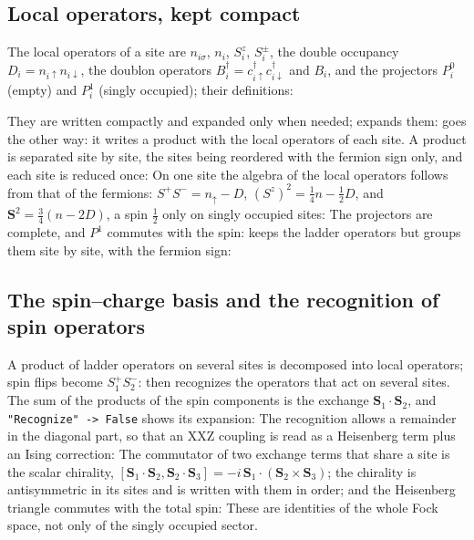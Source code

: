 \documentclass[11pt,a4paper]{article}
\begin{document}
\subsection{Local operators, kept compact}
The local operators of a site are $n_{i\sigma}$, $n_i$, $S^z_i$, $S^\pm_i$, the double occupancy
$D_i=n_{i\uparrow}n_{i\downarrow}$, the doublon operators $B^\dagger_i=c^\dagger_{i\uparrow}c^\dagger_{i\downarrow}$ and $B_i$, and the
projectors $P^0_i$ (empty) and $P^1_i$ (singly occupied); their definitions:

They are written compactly and expanded only when needed;  expands them:
 goes the other way: it writes a product with the local operators of each site. A product is
separated site by site, the sites being reordered with the fermion sign only, and each site is reduced once:
On one site the algebra of the local operators follows from that of the fermions: $S^+S^-=n_\uparrow-D$,
$(S^z)^2=\frac14n-\frac12D$, and $\mathbf S^2=\frac34(n-2D)$, a spin $\frac12$ only on singly occupied sites:
The projectors are complete, and $P^1$ commutes with the spin:
 keeps the ladder operators but groups them site by site, with the fermion sign:

\subsection{The spin--charge basis and the recognition of spin operators}
A product of ladder operators on several sites is decomposed into local operators; spin flips become $S^+_1S^-_2$:
 then recognizes the operators that act on several sites. The sum of the products of the spin
components is the exchange $\mathbf S_1\cdot\mathbf S_2$, and \texttt{"Recognize" -> False} shows its expansion:
The recognition allows a remainder in the diagonal part, so that an XXZ coupling is read as a Heisenberg term plus an
Ising correction:
The commutator of two exchange terms that share a site is the scalar chirality,
$[\mathbf S_1\cdot\mathbf S_2,\mathbf S_2\cdot\mathbf S_3]=-i\,\mathbf S_1\cdot(\mathbf S_2\times\mathbf S_3)$; the chirality is
antisymmetric in its sites and is written with them in order; and the Heisenberg triangle commutes with the total spin:
These are identities of the whole Fock space, not only of the singly occupied sector.
\end{document}
